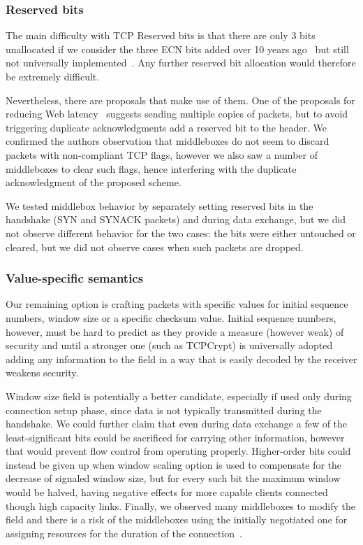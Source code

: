 \documentclass{sig-alternate-10pt}
\begin{document}
\subsubsection*{Reserved bits}

The main difficulty with TCP Reserved bits is that there are only 3 bits unallocated if we consider the three ECN bits added over 10 years ago~\cite{Floyd:up,Ely:uc} but still not universally implemented~\cite{}. Any further reserved bit allocation would therefore be extremely difficult.

Nevertheless, there are proposals that make use of them. One of the proposals for reducing Web latency~\cite{Flach:2013uy} suggests sending multiple copies of packets, but to avoid triggering duplicate acknowledgments add a reserved bit to the header. We confirmed the authors observation that middleboxes do not seem to discard packets with non-compliant TCP flags, however we also saw a number of middleboxes to clear such flags, hence interfering with the duplicate acknowledgment of the proposed scheme.

We tested middlebox behavior by separately setting reserved bits in the handshake (SYN and SYNACK packets) and during data exchange, but we did not observe different behavior for the two cases: the bits were either untouched or cleared, but we did not observe cases when such packets are dropped.

\subsubsection*{Value-specific semantics}

Our remaining option is crafting packets with specific values for initial sequence numbers, window size or a specific checksum value. Initial sequence numbers, however, must be hard to predict as they provide a measure (however weak) of security and until a stronger one (such as TCPCrypt) is universally adopted adding any information to the field in a way that is easily decoded by the receiver weakens security.

Window size field is potentially a better candidate, especially if used only during connection setup phase, since data is not typically transmitted during the handshake. We could further claim that even during data exchange a few of the least-significant bits could be sacrificed for carrying other information, however that would prevent flow control from operating properly. Higher-order bits could instead be given up when window scaling option is used to compensate for the decrease of signaled window size, but for every such bit the maximum window would be halved, having negative effects for more capable clients connected though high capacity links. Finally, we observed many middleboxes to modify the field and there is a risk of the middleboxes using the initially negotiated one for assigning resources for the duration of the connection~\cite{}.
\end{document}
